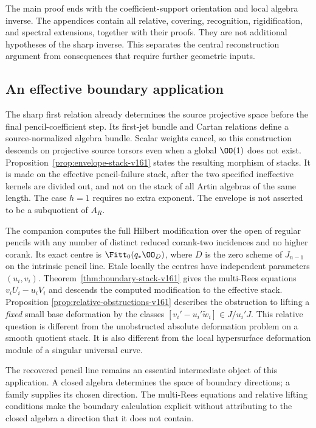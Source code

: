 The main proof ends with the coefficient-support orientation and
local algebra inverse. The appendices contain all relative,
covering, recognition, rigidification, and spectral extensions,
together with their proofs. They are not additional hypotheses of
the sharp inverse. This separates the central reconstruction
argument from consequences that require further geometric inputs.

\subsection{An effective boundary application}
The sharp first relation already determines the source projective
space before the final pencil-coefficient step. Its first-jet
bundle and Cartan relations define a source-normalized algebra
bundle. Scalar weights cancel, so this construction descends on
projective source torsors even when a global $\OO(1)$ does not exist.
Proposition~\ref{prop:envelope-stack-v161} states the resulting
morphism of stacks. It is made on the effective pencil-failure
stack, after the two specified ineffective kernels are divided out,
and not on the stack of all Artin algebras of the same length.
The case $h=1$ requires no extra exponent. The envelope is not
asserted to be a subquotient of $A_R$.

The companion computes the full Hilbert modification over the open
of regular pencils with any number of distinct reduced corank-two
incidences and no higher corank. Its exact centre is
$\Fitt_0(q_*\OO_D)$, where $D$ is the zero scheme of $J_{n-1}$ on
the intrinsic pencil line. Etale locally the centres have independent
parameters $(u_i,v_i)$. Theorem~\ref{thm:boundary-stack-v161} gives
the multi-Rees equations $v_iU_i-u_iV_i$ and descends the computed
modification to the effective stack. Proposition
\ref{prop:relative-obstructions-v161} describes the obstruction to
lifting a \emph{fixed} small base deformation by the classes
$[v_i'-u_i'\widetilde w_i]\in J/u_i'J$. This relative question is
different from the unobstructed absolute deformation problem on a
smooth quotient stack. It is also different from the local
hypersurface deformation module of a singular universal curve.

The recovered pencil line remains an essential intermediate object
of this application. A closed algebra determines the space of
boundary directions; a family supplies its chosen direction. The
multi-Rees equations and relative lifting conditions make the
boundary calculation explicit without attributing to the closed
algebra a direction that it does not contain.


